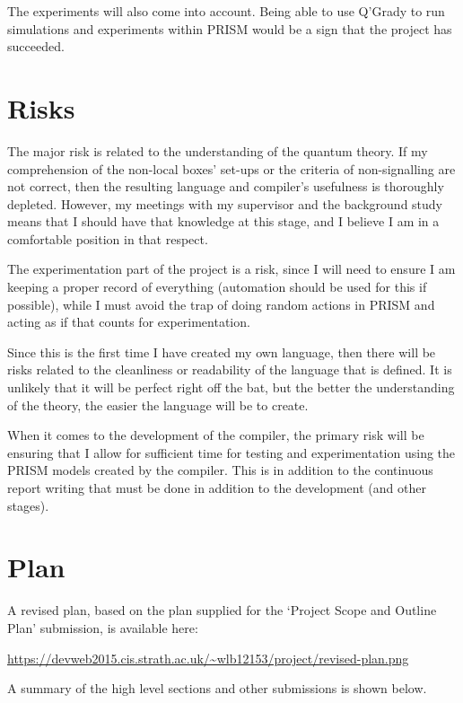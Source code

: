 \documentclass[11pt, a4paper]{article}
\begin{document}
The experiments will also come into account. Being able to use Q'Grady to run
simulations and experiments within PRISM would be a sign that the project has
succeeded.


\section{Risks} %
\label{sec:risks}
The major risk is related to the understanding of the quantum theory. If my 
comprehension of the non-local boxes' set-ups or the criteria of non-signalling
are not correct, then the resulting language and compiler's usefulness is
thoroughly depleted. However, my meetings with my supervisor and the background
study means that I should have that knowledge at this stage, and I believe I am
in a comfortable position in that respect.

The experimentation part of the project is a risk, since I will need to ensure I
am keeping a proper record of everything (automation should be used for this if
possible), while I must avoid the trap of doing random actions in PRISM and
acting as if that counts for experimentation.

Since this is the first time I have created my own language, then there will be
risks related to the cleanliness or readability of the language that is defined.
It is unlikely that it will be perfect right off the bat, but the better the
understanding of the theory, the easier the language will be to create.

When it comes to the development of the compiler, the primary risk will be
ensuring that I allow for sufficient time for testing and experimentation using
the PRISM models created by the compiler. This is in addition to the continuous
report writing that must be done in addition to the development (and other
stages).


\section{Plan} %
\label{sec:plan}
A revised plan, based on the plan supplied for the `Project Scope and Outline
Plan' submission, is available here:

\url{https://devweb2015.cis.strath.ac.uk/~wlb12153/project/revised-plan.png}

A summary of the high level sections and other submissions is shown below.
\end{document}
